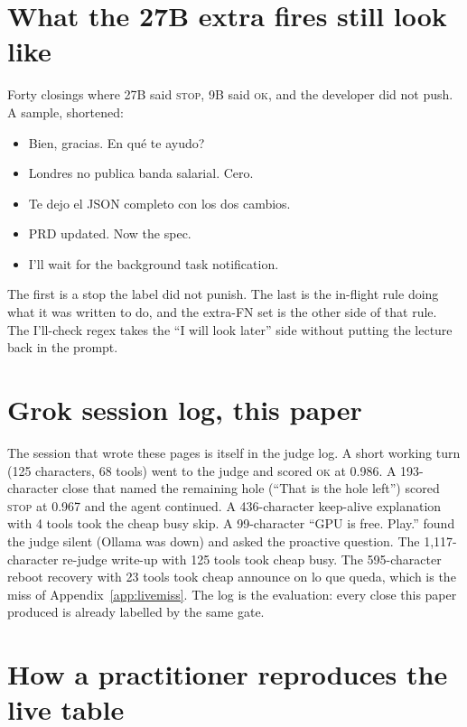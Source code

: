 \section{What the 27B extra fires still look like}
\label{app:extrafp}

Forty closings where 27B said \textsc{stop}, 9B said \textsc{ok}, and
the developer did not push. A sample, shortened:

\begin{itemize}
\item Bien, gracias. \textquestiondown En qu\'e te ayudo?
\item Londres no publica banda salarial. Cero.
\item Te dejo el JSON completo con los dos cambios.
\item PRD updated. Now the spec.
\item I'll wait for the background task notification.
\end{itemize}

The first is a stop the label did not punish. The last is the
in-flight rule doing what it was written to do, and the extra-FN
set is the other side of that rule. The I'll-check regex takes the
``I will look later'' side without putting the lecture back in the
prompt.

\section{Grok session log, this paper}
\label{app:groklog}

The session that wrote these pages is itself in the judge log. A
short working turn (125 characters, 68 tools) went to the judge and
scored \textsc{ok} at 0.986. A 193-character close that named the
remaining hole (``That is the hole left'') scored \textsc{stop} at
0.967 and the agent continued. A 436-character keep-alive
explanation with 4 tools took the cheap busy skip. A 99-character
``GPU is free. Play.'' found the judge silent (Ollama was down)
and asked the proactive question. The 1{,}117-character re-judge
write-up with 125 tools took cheap busy. The 595-character reboot
recovery with 23 tools took cheap announce on lo que queda, which
is the miss of Appendix~\ref{app:livemiss}. The log is the
evaluation: every close this paper produced is already labelled by
the same gate.

\section{How a practitioner reproduces the live table}
\label{app:liverepro}

